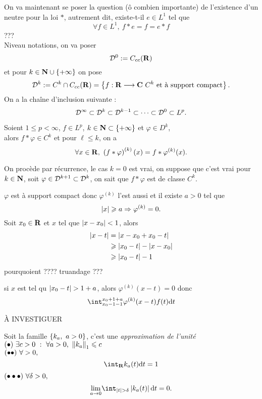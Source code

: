 \documentclass[a4paper,11pt, twoside]{article}
\begin{document}
On va maintenant se poser la question (ô combien importante) de l'existence d'un neutre pour la loi $*$, autrement dit, existe-t-il $e\in L^1$ tel que 
$$\forall f\in L^1,\ f*e=f=e*f$$
???\\


Niveau notations, on va poser
$$\mathcal D^0:=C_{cc}(\mathbf R)$$
et pour $k\in \mathbf N\cup\left\{+\infty\right\}$ on pose 
$$\mathcal D^k:=C^k\cap C_{cc}(\mathbf R)=\left\{f:\mathbf R\longrightarrow\mathbf C\ C^k\text{ et à support compact}\right\}.$$
On a la chaîne d'inclusion suivante : 
$$\mathcal D^\infty\subset \mathcal D^k\subset \mathcal D^{k-1}\subset\cdots\subset \mathcal D^0\subset L^p.$$


\begin{prop}
  Soient $1\leqslant p<\infty$, $f\in L^p$, $k\in\mathbf N\subset\left\{+\infty\right\}$ et $\varphi\in D^k$,\\

  alors $f*\varphi\in C^k$ et pour $\ell\leqslant k$, on a 
  $$\forall x\in\R,\ \Par{f*\varphi}^{(k)}(x)=f*\varphi^{(k)}(x).$$
\end{prop}


\begin{Proof}
  On procède par récurrence, le cas $k=0$ est vrai, on suppose que c'est vrai pour $k\in\mathbf N$, soit $\varphi\in \mathcal D^{k+1}\subset \mathcal D^k$, on sait que $f*\varphi$ est de classe $C^k$.

  $\varphi$ est à support compact donc $\varphi^{(k)}$ l'est aussi et il existe $a>0$ tel que 
  $$\left| x\right|\geqslant a\Rightarrow \varphi^{(k)}=0.$$
  Soit $x_0\in\mathbf R$ et $x$ tel que $\left| x-x_0\right|<1$, alors 
  \begin{align*}
    \left| x-t\right|&=\left| x-x_0+x_0-t\right|\\
    &\geqslant\left| x_0-t\right|-\left| x-x_0\right|\\
    &\geqslant \left| x_0-t\right|-1
  \end{align*}
pourquoient ???? truandage ???

si $x$ est tel qu $\abs{x_0-t}>1+a$, alors $\varphi^{(k)}(x-t)=0$
donc 
$$\int_{x_0-1-1}^{x_0+1+a}\varphi^{(k)}(x-t)f(t)\dt$$


À INVESTIGUER
\end{Proof}




\begin{Def}
  Soit la famille $\ens{k_a,\ a>0}$, c'est une \emph{approximation de l'unité} \ssi\\
  $\Bullet\ \exists c>0\ :\ \forall a>0,\ \norm{k_a}_1\leqslant c$\\
  $(\bullet\bullet)\ \forall >0,$ 
  $$\dstyle\int_\R k_a(t)\dt=1$$
  $(\bullet\bullet\bullet)\ \forall \delta>0,$
  $$\underset{a\to 0}{\mathrm{lim}}\int_{\abs t>\delta}\abs{k_a(t)}\dt=0.$$
\end{Def}
\end{document}
